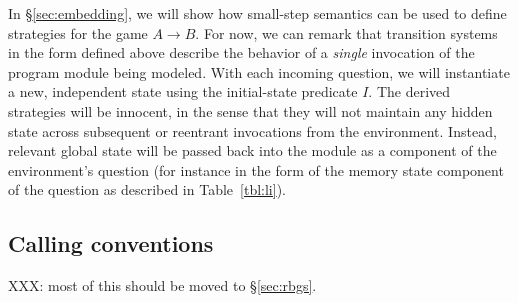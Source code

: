 In \S\ref{sec:embedding},
we will show how small-step semantics can be used to define
strategies for the game $A \rightarrow B$.
For now,
we can remark that transition systems in the form defined above
describe the behavior of a \emph{single} invocation
of the program module being modeled.
With each incoming question,
we will instantiate a new, independent state
using the initial-state predicate $I$.
The derived strategies will be innocent,
in the sense that they will not maintain
any hidden state across subsequent or reentrant
invocations from the environment.
Instead,
relevant global state will be passed back into the module
as a component of the environment's question
(for instance in the form of the memory state component
of the question as described in Table~\ref{tbl:li}).


\subsection{Calling conventions} \label{sec:callconv} %

XXX: most of this should be moved to \S\ref{sec:rbgs}.

